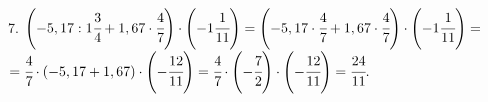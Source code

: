 7. $\left(-5,17:1\cfrac{3}{4}+1,67\cdot\cfrac{4}{7}\right)\cdot\left(-1\cfrac{1}{11}\right)=\left(-5,17\cdot\cfrac{4}{7}+1,67\cdot\cfrac{4}{7}\right)\cdot\left(-1\cfrac{1}{11}\right)=$\\
$=\cfrac{4}{7}\cdot\left(-5,17+1,67\right)\cdot\left(-\cfrac{12}{11}\right)=\cfrac{4}{7}\cdot\left(-\cfrac{7}{2}\right)\cdot\left(-\cfrac{12}{11}\right)=\cfrac{24}{11}.$\\
